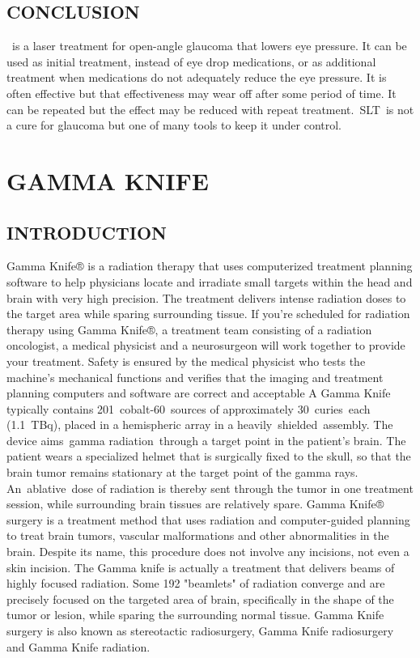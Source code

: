 \documentclass[12pt]{article}
\begin{document}
 \subsection{CONCLUSION}
 \SLT is a laser treatment for open-angle glaucoma that lowers eye pressure. It can be used as initial treatment, instead of eye drop medications, or as additional treatment when medications do not adequately reduce the eye pressure. It is often effective but that effectiveness may wear off after some period of time. It can be repeated but the effect may be reduced with repeat treatment. SLT is not a cure for glaucoma but one of many tools to keep it under control.

 
\section{GAMMA KNIFE}




 \subsection{INTRODUCTION} 
 Gamma Knife® is a radiation therapy that uses computerized treatment planning software to help physicians locate and irradiate small targets within the head and brain with very high precision. The treatment delivers intense radiation doses to the target area while sparing surrounding tissue.
If you're scheduled for radiation therapy using Gamma Knife®, a treatment team consisting of a radiation oncologist, a medical physicist and a neurosurgeon will work together to provide your treatment. Safety is ensured by the medical physicist who tests the machine's mechanical functions and verifies that the imaging and treatment planning computers and software are correct and acceptable
A Gamma Knife typically contains 201 cobalt-60 sources of approximately 30 curies each (1.1 TBq), placed in a hemispheric array in a heavily shielded assembly. The device aims gamma radiation through a target point in the patient's brain. The patient wears a specialized helmet that is surgically fixed to the skull, so that the brain tumor remains stationary at the target point of the gamma rays. An ablative dose of radiation is thereby sent through the tumor in one treatment session, while surrounding brain tissues are relatively spare.
Gamma Knife® surgery is a treatment method that uses radiation and computer-guided planning to treat brain tumors, vascular malformations and other abnormalities in the brain. Despite its name, this procedure does not involve any incisions, not even a skin incision. The Gamma knife is actually a treatment that delivers beams of highly focused radiation. Some 192 "beamlets" of radiation converge and are precisely focused on the targeted area of brain, specifically in the shape of the tumor or lesion, while sparing the surrounding normal tissue.
Gamma Knife surgery is also known as stereotactic radiosurgery, Gamma Knife radiosurgery and Gamma Knife radiation.
\end{document}

